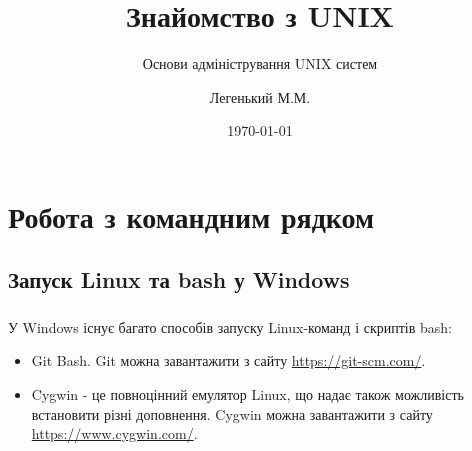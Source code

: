 \documentclass[t]{beamer}  %
\title{Знайомство з UNIX}
\subtitle{Основи адміністрування UNIX систем}
\author{Легенький М.М.}
\date{\today}
\institute[факультет радіофізики, біомедичної електроніки та комп'ютерних систем]{Харківський національний університет імені В. Н. Каразіна}
\begin{document}
\frame[plain]{\titlepage}	%

\section{Робота з командним рядком}
\subsection{Запуск Linux та bash у Windows}
 
\begin{frame}
	\frametitle{\insertsection} 
	\framesubtitle{\insertsubsection}
У Windows існує багато способів запуску Linux-команд і скриптів bash:
	\begin{itemize}
		\item Git Bash. Git можна завантажити з сайту \href{https://git-scm.com/}{https://git-scm.com/}. 
		\item Cygwin - це повноцінний емулятор Linux, що надає також можливість встановити різні доповнення. Cygwin можна завантажити з сайту \href{https://www.cygwin.com/}{https://www.cygwin.com/}.
% 		  
	\end{itemize} 
% 		
		 
\end{frame}
\end{document}
